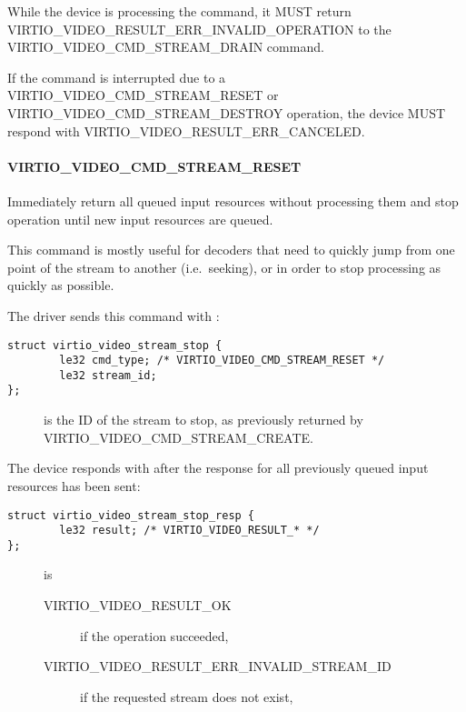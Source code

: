 While the device is processing the command, it MUST return
VIRTIO_VIDEO_RESULT_ERR_INVALID_OPERATION to the
VIRTIO_VIDEO_CMD_STREAM_DRAIN command.

If the command is interrupted due to a VIRTIO_VIDEO_CMD_STREAM_RESET
or VIRTIO_VIDEO_CMD_STREAM_DESTROY operation, the device MUST
respond with VIRTIO_VIDEO_RESULT_ERR_CANCELED.

\paragraph{VIRTIO_VIDEO_CMD_STREAM_RESET}\label{sec:Device Types / Video Device / Device Operation / Device Operation: Stream commands / VIRTIO_VIDEO_CMD_STREAM_RESET}

Immediately return all queued input resources without processing them
and stop operation until new input resources are queued.

This command is mostly useful for decoders that need to quickly jump
from one point of the stream to another (i.e.~seeking), or in order to
stop processing as quickly as possible.

The driver sends this command with
:

\begin{lstlisting}
struct virtio_video_stream_stop {
        le32 cmd_type; /* VIRTIO_VIDEO_CMD_STREAM_RESET */
        le32 stream_id;
};
\end{lstlisting}

\begin{description}
\item[]
is the ID of the stream to stop, as previously returned by
VIRTIO_VIDEO_CMD_STREAM_CREATE.
\end{description}

The device responds with 
after the response for all previously queued input resources has been
sent:

\begin{lstlisting}
struct virtio_video_stream_stop_resp {
        le32 result; /* VIRTIO_VIDEO_RESULT_* */
};
\end{lstlisting}

\begin{description}
\item[]
is

\begin{description}
\item[VIRTIO_VIDEO_RESULT_OK]
if the operation succeeded,
\item[VIRTIO_VIDEO_RESULT_ERR_INVALID_STREAM_ID]
if the requested stream does not exist,
\end{description}
\end{description}

